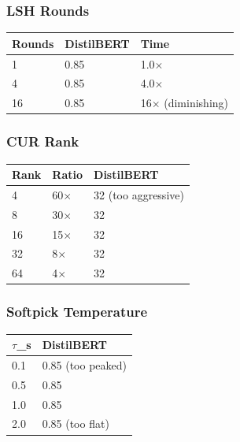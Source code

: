 \subsubsection{LSH Rounds}

\begin{table}[H]
\centering
\small
\begin{tabular}{lll}
\toprule
\textbf{Rounds} & \textbf{DistilBERT} & \textbf{Time} \\
\midrule
1 & 0.85 & 1.0$\times$ \\
4 & 0.85 & 4.0$\times$ \\
16 & 0.85 & 16$\times$ (diminishing) \\
\bottomrule
\end{tabular}
\end{table}

\subsubsection{CUR Rank}

\begin{table}[H]
\centering
\small
\begin{tabular}{lll}
\toprule
\textbf{Rank} & \textbf{Ratio} & \textbf{DistilBERT} \\
\midrule
4 & 60$\times$ & 32 (too aggressive) \\
8 & 30$\times$ & 32 \\
16 & 15$\times$ & 32 \\
32 & 8$\times$ & 32 \\
64 & 4$\times$ & 32 \\
\bottomrule
\end{tabular}
\end{table}

\subsubsection{Softpick Temperature}

\begin{table}[H]
\centering
\small
\begin{tabular}{ll}
\toprule
\textbf{$\tau$\_s} & \textbf{DistilBERT} \\
\midrule
0.1 & 0.85 (too peaked) \\
0.5 & 0.85 \\
1.0 & 0.85 \\
2.0 & 0.85 (too flat) \\
\bottomrule
\end{tabular}
\end{table}

